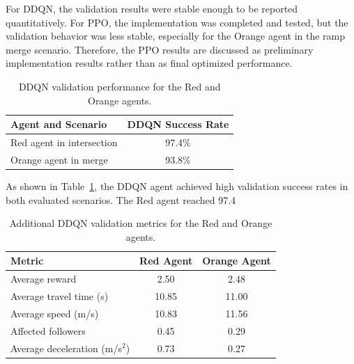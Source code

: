 \documentclass{article}
\begin{document}
For DDQN, the validation results were stable enough to be reported quantitatively. For PPO, the implementation was completed and tested, but the validation behavior was less stable, especially for the Orange agent in the ramp merge scenario. Therefore, the PPO results are discussed as preliminary implementation results rather than as final optimized performance.

\begin{table}[H]
\centering
\caption{DDQN validation performance for the Red and Orange agents.}
\label{tab:ddqn_validation_results}
\vspace{0.2cm}
\begin{tabular}{|p{}|c|}
\hline
\textbf{Agent and Scenario} & \textbf{DDQN Success Rate} \\
\hline
Red agent in intersection & 97.4\% \\
\hline
Orange agent in merge & 93.8\% \\
\hline
\end{tabular}
\end{table}

\noindent
As shown in Table~\ref{tab:ddqn_validation_results}, the DDQN agent achieved high validation success rates in both evaluated scenarios. The Red agent reached 97.4%

\begin{table}[H]
\centering
\caption{Additional DDQN validation metrics for the Red and Orange agents.}
\label{tab:ddqn_additional_metrics}
\vspace{0.2cm}
\begin{tabular}{|p{}|c|c|}
\hline
\textbf{Metric} & \textbf{Red Agent} & \textbf{Orange Agent} \\
\hline
Average reward & 2.50 & 2.48 \\
\hline
Average travel time (s) & 10.85 & 11.00 \\
\hline
Average speed (m/s) & 10.83 & 11.56 \\
\hline
Affected followers & 0.45 & 0.29 \\
\hline
Average deceleration (m/s$^2$) & 0.73 & 0.27 \\
\hline
\end{tabular}
\end{table}
\end{document}
